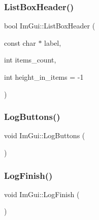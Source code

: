 \mbox{\label{namespace_im_gui_a6c5c48e5e5b90365f3f6faaa3307af26}} 
\subsubsection{\texorpdfstring{List\+Box\+Header()}{ListBoxHeader()}\hspace{0.1cm}{\footnotesize\ttfamily [2/2]}}
{\footnotesize\ttfamily bool Im\+Gui\+::\+List\+Box\+Header (\begin{DoxyParamCaption}\item[{const char $\ast$}]{label,  }\item[{int}]{items\+\_\+count,  }\item[{int}]{height\+\_\+in\+\_\+items = {\ttfamily -\/1} }\end{DoxyParamCaption})}

\mbox{\label{namespace_im_gui_a7bd295da4be19bab98262c76fcaeb4fb}} 
\subsubsection{\texorpdfstring{Log\+Buttons()}{LogButtons()}}
{\footnotesize\ttfamily void Im\+Gui\+::\+Log\+Buttons (\begin{DoxyParamCaption}{ }\end{DoxyParamCaption})}

\mbox{\label{namespace_im_gui_a2ebcd048d1ca025fb972e1c2e920e3f3}} 
\subsubsection{\texorpdfstring{Log\+Finish()}{LogFinish()}}
{\footnotesize\ttfamily void Im\+Gui\+::\+Log\+Finish (\begin{DoxyParamCaption}{ }\end{DoxyParamCaption})}

\mbox{\label{namespace_im_gui_aa548475d8f771ab6524d73d900a41198}} 
